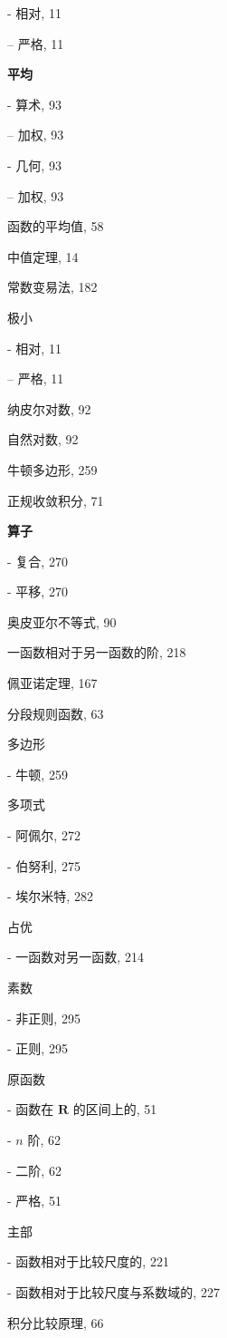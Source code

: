 - 相对, 11

-- 严格, 11

\par\noindent\textbf{平均}\par

- 算术, 93

-- 加权, 93

- 几何, 93

-- 加权, 93

函数的平均值, 58

中值定理, 14

常数变易法, 182

极小

- 相对, 11

-- 严格, 11

纳皮尔对数, 92

自然对数, 92

牛顿多边形, 259

正规收敛积分, 71

\par\noindent\textbf{算子}\par

- 复合, 270

- 平移, 270

奥皮亚尔不等式, 90

一函数相对于另一函数的阶, 218

佩亚诺定理, 167

分段规则函数, 63

多边形

- 牛顿, 259

多项式

- 阿佩尔, 272

- 伯努利, 275

- 埃尔米特, 282

占优

- 一函数对另一函数, 214

素数

- 非正则, 295

- 正则, 295

原函数

- 函数在 \(\mathbf{R}\) 的区间上的, 51

- \(n\) 阶, 62

- 二阶, 62

- 严格, 51

主部

- 函数相对于比较尺度的, 221

- 函数相对于比较尺度与系数域的, 227

积分比较原理, 66

